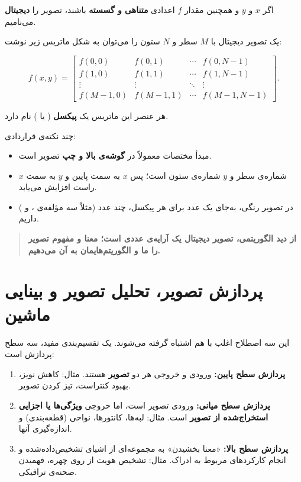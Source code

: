 \documentclass[11pt,a4paper]{article}
\begin{document}
	اگر $x$ و $y$ و همچنین مقدار $f$ اعدادی \textbf{متناهی و گسسته} باشند، تصویر را
	\textbf{دیجیتال} می‌نامیم.
	
	یک تصویر دیجیتال با $M$ سطر و $N$ ستون را می‌توان به شکل ماتریس زیر نوشت:
	
	\[
	f(x,y)=
	\begin{bmatrix}
		f(0,0) & f(0,1) & \cdots & f(0,N-1)\\
		f(1,0) & f(1,1) & \cdots & f(1,N-1)\\
		\vdots & \vdots & \ddots & \vdots\\
		f(M-1,0) & f(M-1,1) & \cdots & f(M-1,N-1)
	\end{bmatrix}.
	\]
	
	هر عنصر این ماتریس یک \textbf{پیکسل} ( یا ) نام دارد.
	
	چند نکته‌ی قراردادی:
	
	\begin{itemize}
		\item مبدأ مختصات معمولاً در \textbf{گوشه‌ی بالا و چپ} تصویر است.
		\item $x$ شماره‌ی سطر و $y$ شماره‌ی ستون است؛ پس $x$ به سمت پایین و $y$ به سمت راست افزایش می‌یابد.
		\item در تصویر رنگی، به‌جای یک عدد برای هر پیکسل، چند عدد (مثلاً سه مؤلفه‌ی ،  و ) داریم.
	\end{itemize}
	
	\begin{quote}
		\textbf{از دید الگوریتمی، تصویر دیجیتال یک آرایه‌ی عددی است؛
			معنا و مفهوم تصویر را ما و الگوریتم‌هایمان به آن می‌دهیم.}
	\end{quote}
	
	
	\section{پردازش تصویر، تحلیل تصویر و بینایی ماشین}
	
	این سه اصطلاح اغلب با هم اشتباه گرفته می‌شوند. یک تقسیم‌بندی مفید، سه سطح پردازش است:
	
	\begin{enumerate}
		\item \textbf{پردازش سطح پایین:} ورودی و خروجی هر دو \textbf{تصویر} هستند.
		مثال: کاهش نویز، بهبود کنتراست، تیز کردن تصویر.
		\item \textbf{پردازش سطح میانی:} ورودی تصویر است، اما خروجی \textbf{ویژگی‌ها یا اجزایی استخراج‌شده از تصویر} است.
		مثال: لبه‌ها، کانتورها، نواحی (قطعه‌بندی) و اندازه‌گیری آنها.
		\item \textbf{پردازش سطح بالا:} «معنا بخشیدن» به مجموعه‌ای از اشیای تشخیص‌داده‌شده
		و انجام کارکردهای مربوط به ادراک.
		مثال: تشخیص هویت از روی چهره، فهمیدن صحنه‌ی ترافیکی.
	\end{enumerate}
	
\end{document}
